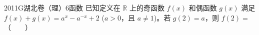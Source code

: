 
\begin{problem}{2011}{G}{湖北卷（理）}{6}{函数}
已知定义在 $\mathbb{R}$ 上的奇函数 $f(x)$ 和偶函数 $g(x)$ 满足 $f(x)+g(x)=a^x-a^{-x}+2$ ($a>0$，且 $a\neq1$)。若 $g(2)=a$，则 $f(2)=$ \hspace{1cm}（　　）
\begin{choices}
\end{choices}
\end{problem}

\begin{answer}

\end{answer}

\begin{solutions}

\end{solutions}